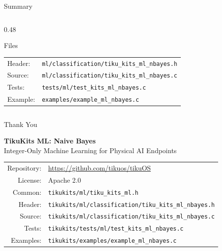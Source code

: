 \documentclass[aspectratio=169, 10pt]{beamer}
\begin{document}
\begin{frame}{Summary}
\begin{columns}[T]
\begin{column}{0.48\textwidth}
\begin{block}{Files}
\scriptsize
\begin{tabular}{@{}lp{4.5cm}@{}}
Header: & \texttt{ml/classification/tiku\_kits\_ml\_nbayes.h} \\
Source: & \texttt{ml/classification/tiku\_kits\_ml\_nbayes.c} \\
Tests: & \texttt{tests/ml/test\_kits\_ml\_nbayes.c} \\
Example: & \texttt{examples/example\_ml\_nbayes.c} \\
\end{tabular}
\end{block}
\end{column}
\end{columns}
\end{frame}

\begin{frame}{Thank You}
\begin{center}
\Large\textbf{TikuKits ML: Naive Bayes}\\[0.5em]
\normalsize Integer-Only Machine Learning for Physical AI Endpoints\\[1.5em]

\begin{tabular}{rl}
  Repository: & \url{https://github.com/tikuos/tikuOS} \\
  License:    & Apache 2.0 \\
  Common:     & \texttt{tikukits/ml/tiku\_kits\_ml.h} \\
  Header:     & \texttt{tikukits/ml/classification/tiku\_kits\_ml\_nbayes.h} \\
  Source:     & \texttt{tikukits/ml/classification/tiku\_kits\_ml\_nbayes.c} \\
  Tests:      & \texttt{tikukits/tests/ml/test\_kits\_ml\_nbayes.c} \\
  Examples:   & \texttt{tikukits/examples/example\_ml\_nbayes.c} \\
\end{tabular}
\end{center}
\end{frame}
\end{document}
